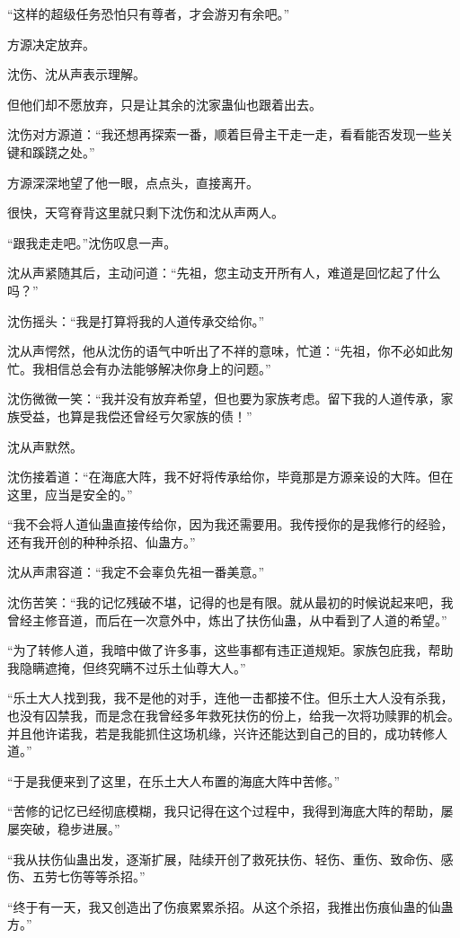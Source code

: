 \begin{this_body}
“这样的超级任务恐怕只有尊者，才会游刃有余吧。”

方源决定放弃。

沈伤、沈从声表示理解。

但他们却不愿放弃，只是让其余的沈家蛊仙也跟着出去。

沈伤对方源道：“我还想再探索一番，顺着巨骨主干走一走，看看能否发现一些关键和蹊跷之处。”

方源深深地望了他一眼，点点头，直接离开。

很快，天穹脊背这里就只剩下沈伤和沈从声两人。

“跟我走走吧。”沈伤叹息一声。

沈从声紧随其后，主动问道：“先祖，您主动支开所有人，难道是回忆起了什么吗？”

沈伤摇头：“我是打算将我的人道传承交给你。”

沈从声愕然，他从沈伤的语气中听出了不祥的意味，忙道：“先祖，你不必如此匆忙。我相信总会有办法能够解决你身上的问题。”

沈伤微微一笑：“我并没有放弃希望，但也要为家族考虑。留下我的人道传承，家族受益，也算是我偿还曾经亏欠家族的债！”

沈从声默然。

沈伤接着道：“在海底大阵，我不好将传承给你，毕竟那是方源亲设的大阵。但在这里，应当是安全的。”

“我不会将人道仙蛊直接传给你，因为我还需要用。我传授你的是我修行的经验，还有我开创的种种杀招、仙蛊方。”

沈从声肃容道：“我定不会辜负先祖一番美意。”

沈伤苦笑：“我的记忆残破不堪，记得的也是有限。就从最初的时候说起来吧，我曾经主修音道，而后在一次意外中，炼出了扶伤仙蛊，从中看到了人道的希望。”

“为了转修人道，我暗中做了许多事，这些事都有违正道规矩。家族包庇我，帮助我隐瞒遮掩，但终究瞒不过乐土仙尊大人。”

“乐土大人找到我，我不是他的对手，连他一击都接不住。但乐土大人没有杀我，也没有囚禁我，而是念在我曾经多年救死扶伤的份上，给我一次将功赎罪的机会。并且他许诺我，若是我能抓住这场机缘，兴许还能达到自己的目的，成功转修人道。”

“于是我便来到了这里，在乐土大人布置的海底大阵中苦修。”

“苦修的记忆已经彻底模糊，我只记得在这个过程中，我得到海底大阵的帮助，屡屡突破，稳步进展。”

“我从扶伤仙蛊出发，逐渐扩展，陆续开创了救死扶伤、轻伤、重伤、致命伤、感伤、五劳七伤等等杀招。”

“终于有一天，我又创造出了伤痕累累杀招。从这个杀招，我推出伤痕仙蛊的仙蛊方。”


\end{this_body}
